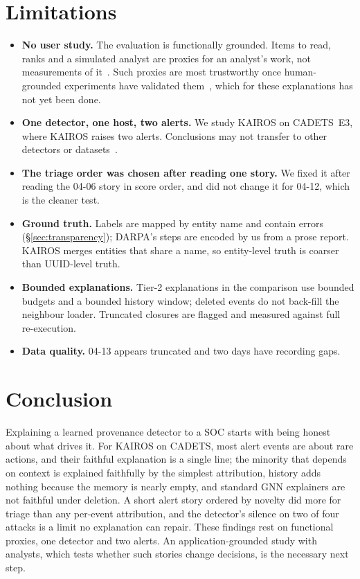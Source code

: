 \documentclass[conference]{IEEEtran}
\begin{document}
\section{Limitations}
\begin{itemize}
\item \textbf{No user study.} The evaluation is functionally grounded. Items to read, ranks and a
  simulated analyst are proxies for an analyst's work, not measurements of it~\cite{doshivelez,nyreyu}.
  Such proxies are most trustworthy once human-grounded experiments have validated them~\cite{doshivelez},
  which for these explanations has not yet been done.
\item \textbf{One detector, one host, two alerts.} We study KAIROS on CADETS~E3, where KAIROS raises two
  alerts. Conclusions may not transfer to other detectors or datasets~\cite{bilot,guerra}.
\item \textbf{The triage order was chosen after reading one story.} We fixed it after reading the 04-06
  story in score order, and did not change it for 04-12, which is the cleaner test.
\item \textbf{Ground truth.} Labels are mapped by entity name and contain errors
  (\S\ref{sec:transparency}); DARPA's steps are encoded by us from a prose report. KAIROS merges entities
  that share a name, so entity-level truth is coarser than UUID-level truth.
\item \textbf{Bounded explanations.} Tier-2 explanations in the comparison use bounded budgets and a
  bounded history window; deleted events do not back-fill the neighbour loader. Truncated closures are
  flagged and measured against full re-execution.
\item \textbf{Data quality.} 04-13 appears truncated and two days have recording gaps.
\end{itemize}

\section{Conclusion}
Explaining a learned provenance detector to a SOC starts with being honest about what drives it. For
KAIROS on CADETS, most alert events are about rare actions, and their faithful explanation is a single
line; the minority that depends on context is explained faithfully by the simplest attribution, history
adds nothing because the memory is nearly empty, and standard GNN explainers are not faithful under
deletion. A short alert story ordered by novelty did more
for triage than any per-event attribution, and the detector's silence on two of four attacks is a limit
no explanation can repair. These findings rest on functional proxies, one detector and two alerts. An
application-grounded study with analysts, which tests whether such stories change decisions, is the
necessary next step.
\end{document}
